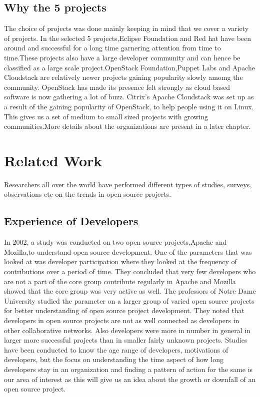 \documentclass[double,12pt]{beavtex}
\begin{document}
\section{Why the 5 projects}
The choice of projects was done mainly keeping in mind that we cover a variety of projects. In the selected 5 projects,Eclipse Foundation and Red hat have been around and successful for a long time garnering attention from time to time.These projects also have a large developer community and can hence be classified as a large scale project.OpenStack Foundation,Puppet Labs and Apache Cloudstack are relatively newer projects gaining popularity slowly amomg the community. OpenStack has made its presence felt strongly as cloud based software is now gathering a lot of buzz. Citrix's Apache Cloudstack was set up as a result of the gaining popularity of OpenStack, to help people using it on Linux. This gives us a set of medium to small sized projects with growing communities.More details about the organizations are present in a later chapter.

\chapter{Related Work}
Researchers all over the world have performed different types of studies, surveys, observations etc on the trends in open source projects.
\section{Experience of Developers}
In 2002, a study was conducted on two open source projects,Apache and Mozilla,to understand open source development. One of the parameters that was looked at was developer participation where they looked at the frequency of contributions over a period of time. They concluded that very few developers who are not a part of the core group contribute regularly in Apache and Mozilla showed that the core group was very active as well\cite{mockus2002}. The professors of Notre Dame University studied the parameter on a larger group of varied open source projects for better understanding of open source project development. They noted that developers in open source projects are not as well connected as developers in other collaborative networks. Also developers were more in number in general in larger more successful projects than in smaller fairly unknown projects\cite{greg2002}. Studies have been conducted to know the age range of developers, motivations of developers, but the focus on understanding the time aspect of how long developers stay in an organization and finding a pattern of action for the same is our area of interest as this will give us an idea about the growth or downfall of an open source project.
\end{document}
